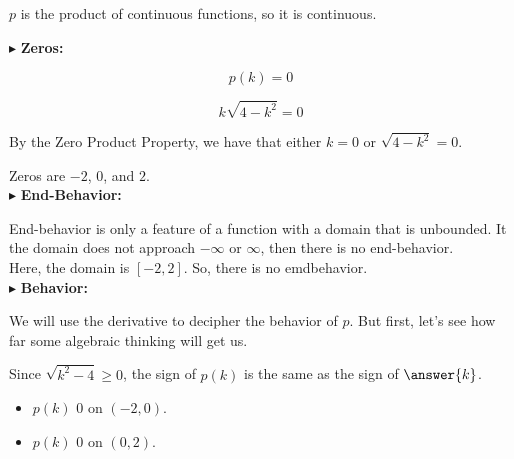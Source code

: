 \documentclass{ximera}
\begin{document}
\begin{example}
$p$ is the product of continuous functions, so it is continuous.












$\blacktriangleright$  \textbf{\textcolor{blue!55!black}{Zeros:}} 


\[  p(k) = 0   \]

\[  k \sqrt{4-k^2} = 0  \]


By the Zero Product Property, we have that either $k = 0$ or $\sqrt{4-k^2} = 0$.


Zeros are $-2$, $0$, and $2$. \\








$\blacktriangleright$ \textbf{\textcolor{blue!55!black}{End-Behavior:}}  


End-behavior is only a feature of a function with a domain that is unbounded.  It the domain does not approach $-\infty$ or $\infty$, then there is no end-behavior.\\


Here, the domain is $[-2, 2]$.  So, there is no emdbehavior. \\













$\blacktriangleright$ \textbf{\textcolor{blue!55!black}{Behavior:}}  



We will use the derivative to decipher the behavior of $p$.  But first, let's see how far some algebraic thinking will get us. \\


\begin{idea}

Since $\sqrt{k^2 - 4} \geq 0$, the sign of $p(k)$ is the same as the sign of $\answer{k}$.

\begin{itemize}
\item  $p(k)$ \wordChoice{\choice[correct]{$<$} \choice{$>$}}  $0$ on $(-2, 0)$.
\item  $p(k)$ \wordChoice{\choice{$<$} \choice[correct]{$>$}}  $0$ on $(0, 2)$.
\end{itemize}



\end{idea}
\end{example}
\end{document}
